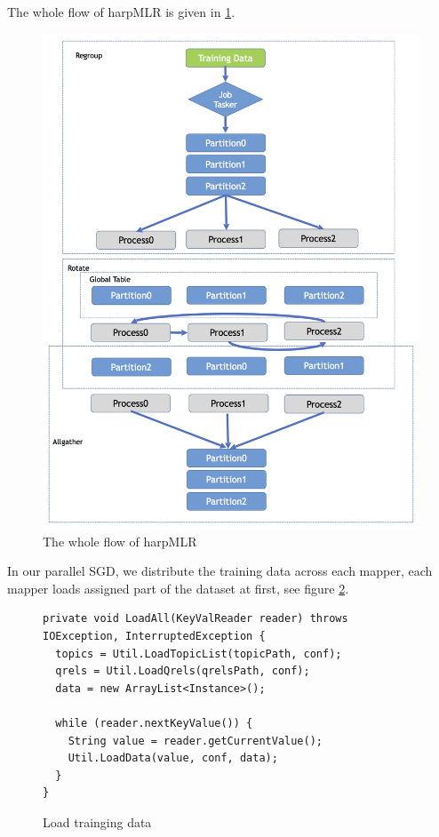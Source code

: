 \documentclass{sig-alternate-05-2015}
\begin{document}
The whole flow of harpMLR is given in  \ref{fig:sketch}.
\begin{figure}
  \includegraphics[scale=0.45]{fig/sketch.png}
  \caption{The whole flow of harpMLR}
  \label{fig:sketch}
\end{figure}

In our parallel SGD, we distribute the training data across each mapper,
each mapper loads assigned part of the dataset at first, see figure \ref{fig:load}.
\begin{figure}
\begin{lstlisting}
private void LoadAll(KeyValReader reader) throws IOException, InterruptedException {
  topics = Util.LoadTopicList(topicPath, conf);
  qrels = Util.LoadQrels(qrelsPath, conf);
  data = new ArrayList<Instance>();

  while (reader.nextKeyValue()) {
    String value = reader.getCurrentValue();
    Util.LoadData(value, conf, data);
  }
}
\end{lstlisting}
\caption{Load trainging data}
\label{fig:load}
\end{figure}
\end{document}

